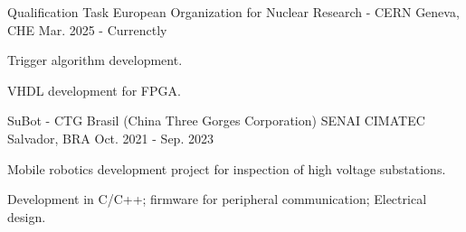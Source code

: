

\begin{cventries}
\cventry
{Qualification Task} %
{European Organization for Nuclear Research - CERN} %
{Geneva, CHE} %
{Mar. 2025 - Currenctly} %
{
  \begin{cvitems} %
    \item {Trigger algorithm development.}
    \item {VHDL development for FPGA.}
  \end{cvitems}
}


  \cventry
    {SuBot - CTG Brasil (China Three Gorges Corporation)} %
    {SENAI CIMATEC} %
    {Salvador, BRA} %
    {Oct. 2021 - Sep. 2023} %
    {
      \begin{cvitems} %
        \item {Mobile robotics development project for inspection of high voltage substations.}
        \item {Development in C/C++; firmware for peripheral communication; Electrical design.}
      \end{cvitems}
    }



\end{cventries}
